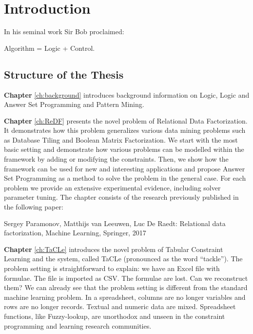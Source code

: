 \chapter{Introduction}\label{ch:introduction}

In his seminal work Sir Bob \textcite{kowalski} proclaimed:
\begin{center}
  Algorithm = Logic + Control.
\end{center}




\section{Structure of the Thesis}
\textbf{Chapter} \ref{ch:background} introduces background information on Logic, Logic and Answer Set Programming and Pattern Mining.

\textbf{Chapter} \ref{ch:ReDF} presents the novel problem of Relational Data
Factorization. It demonstrates how this problem generalizes various
data mining problems such as Database Tiling and Boolean Matrix
Factorization. We start with the most basic setting and demonstrate
how various problems can be modelled within the framework by adding
or modifying the constraints. Then, we show how the framework can be
used for new and interesting applications and propose Answer Set
Programming as a method to solve the problem in the general case.
For each problem we provide an extensive experimental evidence,
including solver parameter tuning. The chapter consists of the
research previously published in the following paper:

\begin{addmargin}[2em]{2em}

Sergey Paramonov,  Matthijs van Leeuwen, Luc De Raedt: Relational data
factorization, Machine Learning, Springer, 2017

\end{addmargin}



\textbf{Chapter} \ref{ch:TaCLe} introduces  the novel problem of
Tabular Constraint Learning and the system, called TaCLe (pronounced
as the word ``tackle''). The problem setting is straightforward to
explain: we have an Excel file with formulae. The file is imported as
CSV. The formulae are lost. Can we reconstruct them? We can already 
see that the problem setting is different from the standard machine
learning problem. In a spreadsheet, columns are no longer variables
and rows are no longer records. Textual and numeric data are mixed.
Spreadsheet functions, like Fuzzy-lookup, are unorthodox and unseen in
the constraint programming and learning research communities.

